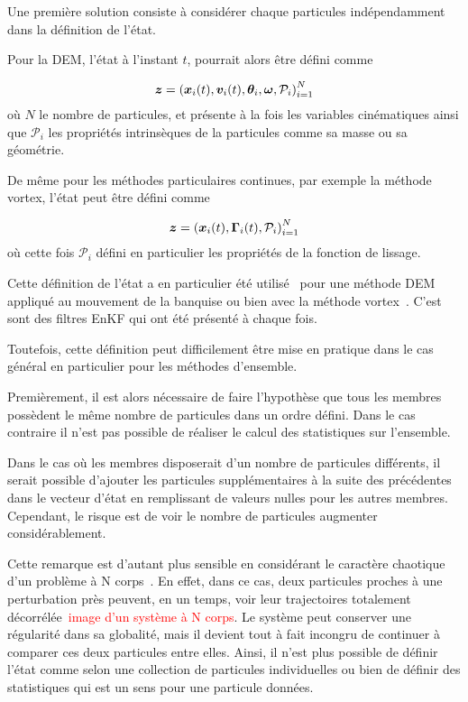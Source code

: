 Une première solution consiste à considérer chaque particules indépendamment dans la définition de l'état.

Pour la DEM, l'état à l’instant $t$, pourrait alors être défini comme

\begin{equation*}
    \bm z = {(\bm{x}_i(t), \bm v_i(t), \bm \theta_i, \bm \omega, \mathcal P_i)}_{i=1}^N
\end{equation*}où $N$ le nombre de particules, et présente à la fois les variables cinématiques ainsi que $\mathcal P_i$ les propriétés intrinsèques de la particules comme sa masse ou sa géométrie.

De même pour les méthodes particulaires continues, par exemple la méthode vortex, l'état peut être défini comme

\begin{equation*}
    \bm z = {(\bm{x}_i(t),\bm \Gamma_i(t), \mathcal P_i)}_{i=1}^N
\end{equation*}où cette fois $\mathcal P_i$ défini en particulier les propriétés de la fonction de lissage.

Cette définition de l'état a en particulier été utilisé~\cite{chen_superfloe_2022} pour une méthode DEM appliqué au mouvement de la banquise ou bien avec la méthode vortex~\cite{darakananda_data-assimilated_2018,le_provost_ensemble_2021}. C'est sont des filtres EnKF qui ont été présenté à chaque fois.

Toutefois, cette définition peut difficilement être mise en pratique dans le cas général en particulier pour les méthodes d'ensemble.

Premièrement, il est alors nécessaire de faire l'hypothèse que tous les membres possèdent le même nombre de particules dans un ordre défini.
Dans le cas contraire il n'est pas possible de réaliser le calcul des statistiques sur l'ensemble.

Dans le cas où les membres disposerait d'un nombre de particules différents, il serait possible d'ajouter les particules supplémentaires à la suite des précédentes dans le vecteur d'état en remplissant de valeurs nulles pour les autres membres. Cependant, le risque est de voir le nombre de particules augmenter considérablement.

Cette remarque est d'autant plus sensible en considérant le caractère chaotique d'un problème à N corps~\cite{poincare1890}. En effet, dans ce cas, deux particules proches à une perturbation près peuvent, en un temps, voir leur trajectoires totalement décorrélée~\textcolor{red}{image d'un système à N corps}. Le système peut conserver une régularité dans sa globalité, mais il devient tout à fait incongru de continuer à comparer ces deux particules entre elles. Ainsi, il n'est plus possible de définir l'état comme selon une collection de particules individuelles ou bien de définir des statistiques qui est un sens pour une particule données.

